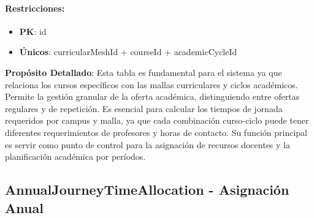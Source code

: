 \documentclass[11pt,a4paper]{article}
\begin{document}
\paragraph{Restricciones:}
\begin{itemize}
    \item \textbf{PK}: id
    \item \textbf{Únicos}: curricularMeshId + courseId + academicCycleId
\end{itemize}

\vspace{0.5cm}

\textbf{Propósito Detallado}: Esta tabla es fundamental para el sistema ya que relaciona los cursos específicos con las mallas curriculares y ciclos académicos. Permite la gestión granular de la oferta académica, distinguiendo entre ofertas regulares y de repetición. Es esencial para calcular los tiempos de jornada requeridos por campus y malla, ya que cada combinación curso-ciclo puede tener diferentes requerimientos de profesores y horas de contacto. Su función principal es servir como punto de control para la asignación de recursos docentes y la planificación académica por períodos.

{\color{darkblue}\Large\subsection{AnnualJourneyTimeAllocation - Asignación Anual}}
\end{document}
